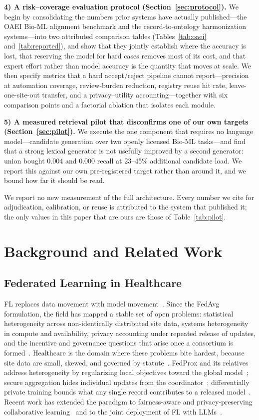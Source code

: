 \documentclass[conference]{IEEEtran}
\begin{document}
\textbf{4) A risk--coverage evaluation protocol (Section~\ref{sec:protocol}).} We begin by consolidating the numbers prior systems have actually published---the OAEI Bio-ML alignment benchmark and the record-to-ontology harmonization systems---into two attributed comparison tables (Tables~\ref{tab:oaei} and~\ref{tab:reported}), and show that they jointly establish where the accuracy is lost, that reserving the model for hard cases removes most of its cost, and that expert effort rather than model accuracy is the quantity that moves at scale. We then specify metrics that a hard accept/reject pipeline cannot report---precision at automation coverage, review-burden reduction, registry reuse hit rate, leave-one-site-out transfer, and a privacy--utility accounting---together with six comparison points and a factorial ablation that isolates each module.

\textbf{5) A measured retrieval pilot that disconfirms one of our own targets (Section~\ref{sec:pilot}).} We execute the one component that requires no language model---candidate generation over two openly licensed Bio-ML tasks---and find that a strong lexical generator is not usefully improved by a second generator: union bought 0.004 and 0.000 recall at 23--45\% additional candidate load. We report this against our own pre-registered target rather than around it, and we bound how far it should be read.

We report no new measurement of the full architecture. Every number we cite for adjudication, calibration, or reuse is attributed to the system that published it; the only values in this paper that are ours are those of Table~\ref{tab:pilot}.

\section{Background and Related Work}
\label{sec:related}

\subsection{Federated Learning in Healthcare}

FL replaces data movement with model movement~\cite{b3}. Since the FedAvg formulation, the field has mapped a stable set of open problems: statistical heterogeneity across non-identically distributed site data, systems heterogeneity in compute and availability, privacy accounting under repeated release of updates, and the incentive and governance questions that arise once a consortium is formed~\cite{b2,b4}. Healthcare is the domain where these problems bite hardest, because site data are small, skewed, and governed by statute~\cite{b5}. FedProx and its relatives address heterogeneity by regularizing local objectives toward the global model~\cite{b27}; secure aggregation hides individual updates from the coordinator~\cite{b26}; differentially private training bounds what any single record contributes to a released model~\cite{b24,b25}. Recent work has extended the paradigm to fairness-aware and privacy-preserving collaborative learning~\cite{b6} and to the joint deployment of FL with LLMs~\cite{b36}.
\end{document}
